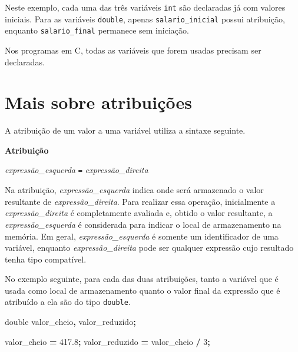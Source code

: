\documentclass[
  11pt,
  a4paper,
]{scrbook}
\newenvironment{Shaded}{\begin{snugshade}}{\end{snugshade}}
\newcommand{\DataTypeTok}[1]{\textcolor[rgb]{0.13,0.29,0.53}{#1}}
\newcommand{\DecValTok}[1]{\textcolor[rgb]{0.00,0.00,0.81}{#1}}
\newcommand{\FloatTok}[1]{\textcolor[rgb]{0.00,0.00,0.81}{#1}}
\newcommand{\NormalTok}[1]{#1}
\newcommand{\OperatorTok}[1]{\textcolor[rgb]{0.81,0.36,0.00}{\textbf{#1}}}
\begin{document}
Neste exemplo, cada uma das três variáveis \texttt{int} são declaradas
já com valores iniciais. Para as variáveis \texttt{double}, apenas
\texttt{salario\_inicial} possui atribuição, enquanto
\texttt{salario\_final} permanece sem iniciação.

Nos programas em C, todas as variáveis que forem usadas precisam ser
declaradas.

\section{Mais sobre atribuições}\label{mais-sobre-atribuiuxe7uxf5es}

 A atribuição de um valor a uma variável utiliza a
sintaxe seguinte.

\begin{tcolorbox}[enhanced jigsaw, colback=white, arc=.35mm, colframe=quarto-callout-color-frame, toprule=.15mm, leftrule=.75mm, left=2mm, rightrule=.15mm, bottomrule=.15mm, opacityback=0, breakable]

\vspace{-3mm}\textbf{Atribuição}\vspace{3mm}

\emph{expressão\_esquerda} \texttt{=} \emph{expressão\_direita}

\end{tcolorbox}

Na atribuição, \emph{expressão\_esquerda} indica onde será armazenado o
valor resultante de \emph{expressão\_direita}. Para realizar essa
operação, inicialmente a \emph{expressão\_direita} é completamente
avaliada e, obtido o valor resultante, a \emph{expressão\_esquerda} é
considerada para indicar o local de armazenamento na memória. Em geral,
\emph{expressão\_esquerda} é somente um identificador de uma variável,
enquanto \emph{expressão\_direita} pode ser qualquer expressão cujo
resultado tenha tipo compatível.

No exemplo seguinte, para cada das duas atribuições, tanto a variável
que é usada como local de armazenamento quanto o valor final da
expressão que é atribuído a ela são do tipo \texttt{double}.

\begin{Shaded}
\begin{Highlighting}[]
\DataTypeTok{double}\NormalTok{ valor\_cheio}\OperatorTok{,}\NormalTok{ valor\_reduzido}\OperatorTok{;}

\NormalTok{valor\_cheio }\OperatorTok{=} \FloatTok{417.8}\OperatorTok{;}
\NormalTok{valor\_reduzido }\OperatorTok{=}\NormalTok{ valor\_cheio }\OperatorTok{/} \DecValTok{3}\OperatorTok{;}
\end{Highlighting}
\end{Shaded}
\end{document}
